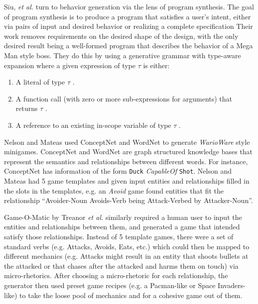 \documentclass[a4paper]{article}
\begin{document}
Siu, \textit{et al.} \cite{programsynthesis} turn to behavior generation via the lens of program synthesis. The goal of program synthesis is to produce a program that satisfies a user's intent, either via pairs of input and desired behavior \cite{Oleksandr Polozov and Sumit Gulwani. 2015. FlashMeta: A framework for
inductive program synthesis} or realizing a complete specification \cite{Eric Schkufza, Rahul Sharma, and Alex Aiken. 2013. Stochastic Superoptimization.} Their work removes requirements on the desired shape of the design, with the only desired result being a well-formed program that describes the behavior of a Mega Man style boss.  They do this by using a generative grammar with type-aware expansion where a given expression of type $\tau$ is either:
\begin{enumerate}
\item A literal of type $\tau$ .
\item A function call (with zero or more sub-expressions for
arguments) that returns $\tau$ .
\item A reference to an existing in-scope variable of type $\tau$ .
\end{enumerate}

Nelson and Mateas \cite{towardsAGD} used ConceptNet \cite{conceptnet} and WordNet \cite{wordnet} to generate \textit{WarioWare} style minigames.  ConceptNet and WordNet are graph structured knowledge bases that represent the semantics and relationships between different words.  For instance, ConceptNet has information of the form \texttt{Duck} \textit{CapableOf} \texttt{Shot}.  Nelson and Mateas had 5 game templates and given input entities and relationships filled in the slots in the templates, e.g. an \textit{Avoid} game found entities that fit the relationship ``Avoider-Noun Avoids-Verb being Attack-Verbed by Attacker-Noun''.  

Game-O-Matic by Treanor \textit{et al.} \cite{gameomatic} similarly required a human user to input the entities and relationships between them, and generated a game that intended satisfy those relationships.  Instead of 5 template games, there were a set of standard verbs (e.g. Attacks, Avoids, Eats, etc.) which could then be mapped to different mechanics (e.g. Attacks might result in an entity that shoots bullets at the attacked or that chases after the attacked and harms them on touch) via micro-rhetorics. After choosing a micro-rhetoric for each relationship, the generator then used preset game recipes (e.g. a Pacman-like or Space Invaders-like) to take the loose pool of mechanics and for a cohesive game out of them. 
\end{document}
